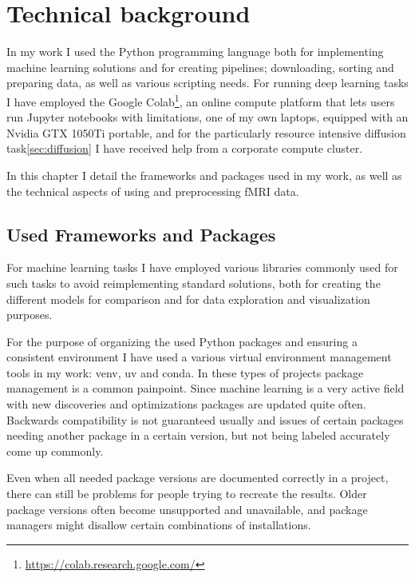 \chapter{Technical background}

	In my work I used the Python programming language both for implementing machine learning solutions and for creating pipelines; downloading, sorting and preparing data, as well as various scripting needs. For running deep learning tasks I have employed the Google Colab\footnote{\url{https://colab.research.google.com/}}, an online compute platform that lets users run Jupyter notebooks with limitations, one of my own laptops, equipped with an Nvidia GTX 1050Ti portable, and for the particularly resource intensive diffusion task\ref{sec:diffusion} I have received help from a corporate compute cluster.
	
	In this chapter I detail the frameworks and packages used in my work, as well as the technical aspects of using and preprocessing fMRI data. 

\section{Used Frameworks and Packages}

	For machine learning tasks I have employed various libraries commonly used for such tasks to avoid reimplementing standard solutions, both for creating the different models for comparison and for data exploration and visualization purposes.
	
	For the purpose of organizing the used Python packages and ensuring a consistent environment I have used a various virtual environment management tools in my work: venv, uv and conda. In these types of projects package management is a common painpoint. Since machine learning is a very active field with new discoveries and optimizations packages are updated quite often. Backwards compatibility is not guaranteed usually and issues of certain packages needing another package in a certain version, but not being labeled accurately come up commonly.
	
	Even when all needed package versions are documented correctly in a project, there can still be problems for people trying to recreate the results. Older package versions often become unsupported and unavailable, and package managers might disallow certain combinations of installations.

